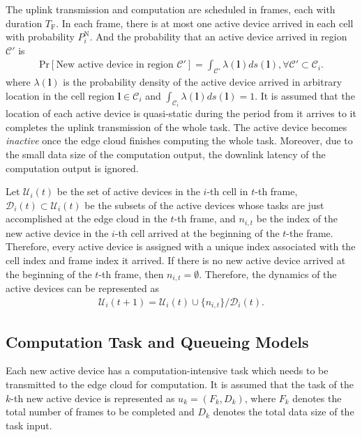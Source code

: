 \documentclass[journal, 12pt, onecolumn, draftclsnofoot]{IEEEtran}
\begin{document}
The uplink transmission and computation are scheduled in frames, each with duration $T_{\mathrm{F}}$. In each frame, there is at most one active device arrived in each cell with probability $P_{i}^{\mathrm{N}}$. And the probability that an active device arrived in region $\mathcal{C}'$ is
\begin{align}
	\mathrm{Pr}[\text{New active device in region }\mathcal{C}']=\int_{\mathcal{C}'}\lambda(\mathbf{l})ds(\mathbf{l}),\forall \mathcal{C}'\subset\mathcal{C}_{i}.
\end{align}
where $\lambda(\mathbf{l})$ is the probability density of the active device arrived in arbitrary location in the cell region $\mathbf{l}\in\mathcal{C}_{i}$ and $\int_{\mathcal{C}_{i}}\lambda(\mathbf{l})ds(\mathbf{l})=1$. It is assumed that the location of each active device is quasi-static during the period from it arrives to it completes the uplink transmission of the whole task. The active device becomes \textit{inactive} once the edge cloud finishes computing the whole task. Moreover, due to the small data size of the computation output, the downlink latency of the computation output is ignored.

Let $\mathcal{U}_{i}(t)$ be the set of active devices in the $i$-th cell in $t$-th frame, $\mathcal{D}_{i}(t)\subset\mathcal{U}_{i}(t)$ be the subsets of the active devices whose tasks are just accomplished at the edge cloud in the $t$-th frame, and $n_{i,t}$ be the index of the new active device in the $i$-th cell arrived at the beginning of the $t$-the frame. Therefore, every active device is assigned with a unique index associated with the cell index and frame index it arrived. If there is no new active device arrived at the beginning of the $t$-th frame, then $n_{i,t}=\emptyset$. Therefore, the dynamics of the active devices can be represented as
\begin{align}
	\mathcal{U}_{i}(t+1)= \mathcal{U}_{i}(t)\cup\{n_{i,t}\}/\mathcal{D}_{i}(t).
\end{align}

\subsection{Computation Task and Queueing Models}
Each new active device has a computation-intensive task which needs to be transmitted to the edge cloud for computation. It is assumed that the task of the $k$-th new active device is represented as $u_{k}=(F_{k},D_{k})$, where $F_{k}$ denotes the total number of frames to be completed and $D_{k}$ denotes the total data size of the task input.
\end{document}

